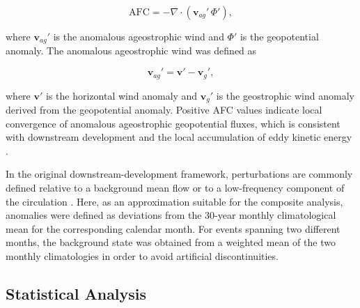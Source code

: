 \documentclass[pdflatex,sn-chicago]{sn-jnl}%
\theoremstyle{plain}
\theoremstyle{definition}
\theoremstyle{remark}
\theoremstyle{definition}
\begin{document}
\begin{equation}
\mathrm{AFC}
=
-\nabla \cdot \left( \mathbf{v}_{ag}' \, \Phi' \right),
\end{equation}

where \(\mathbf{v}_{ag}'\) is the anomalous ageostrophic wind and \(\Phi'\) is the geopotential anomaly. The anomalous ageostrophic wind was defined as

\begin{equation}
\mathbf{v}_{ag}' = \mathbf{v}' - \mathbf{v}_g',
\end{equation}

where \(\mathbf{v}'\) is the horizontal wind anomaly and \(\mathbf{v}_g'\) is the geostrophic wind anomaly derived from the geopotential anomaly. Positive AFC values indicate local convergence of anomalous ageostrophic geopotential fluxes, which is consistent with downstream development and the local accumulation of
eddy kinetic energy \citep[e.g.][]{orlanski1995stages,ndarana2021downstream,pinheiro2022contributions}.

In the original downstream-development framework, perturbations are commonly defined relative to a background mean flow or to a low-frequency component of the circulation \citep[e.g.][]{pinheiro2022contributions,pinheiro2024deepening}. Here, as an approximation suitable for the composite analysis, anomalies were defined as deviations from the 30-year monthly climatological mean for the corresponding calendar month. For events spanning two different months, the background state was obtained from a weighted mean of the two monthly climatologies in order to avoid artificial discontinuities.

\subsection{Statistical Analysis}
\end{document}

